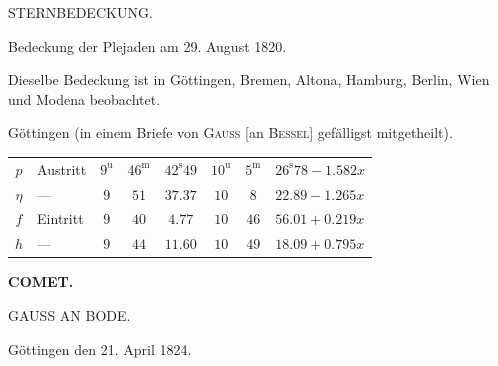 \par{}\bigskip
\hypertarget{native-453-sternbedeckung}{}
\begin{center}
{\large STERNBEDECKUNG.}
\end{center}


\begin{center}
Bedeckung der Plejaden am 29. August 1820.
\end{center}

Dieselbe Bedeckung ist in Göttingen, Bremen, Altona, Hamburg, Berlin, Wien und Modena beobachtet.

\begin{center}
Göttingen (in einem Briefe von \textsc{Gauss} [an \textsc{Bessel}] gefälligst mitgetheilt).

\begingroup\small\setlength{\tabcolsep}{4pt}
\begin{tabular}{c l c c c | c c l}
$p$ & Austritt & $9^{\mathrm u}$ & $46^{\mathrm m}$ & $42^{\mathrm s}49$ & $10^{\mathrm u}$ & $5^{\mathrm m}$ & $26^{\mathrm s}78 - 1.582x$ \\
$\eta$ & --- & $9$ & $51$ & $37.37$ & $10$ & $8$ & $22.89 - 1.265x$ \\
$f$ & Eintritt & $9$ & $40$ & $4.77$ & $10$ & $46$ & $56.01 + 0.219x$ \\
$h$ & --- & $9$ & $44$ & $11.60$ & $10$ & $49$ & $18.09 + 0.795x$ \\
\end{tabular}
\endgroup
\end{center}


\clearpage
\noindent{}%
\makebox[12mm][l]{}%
\parbox[t]{\dimexpr\linewidth-24mm\relax}{\centering\footnotesize\bfseries COMET.\par}%
\par\nobreak\medskip

\begin{center}
{\large GAUSS AN BODE.}
\end{center}


\begin{flushright}
Göttingen den 21. April 1824.
\end{flushright}

